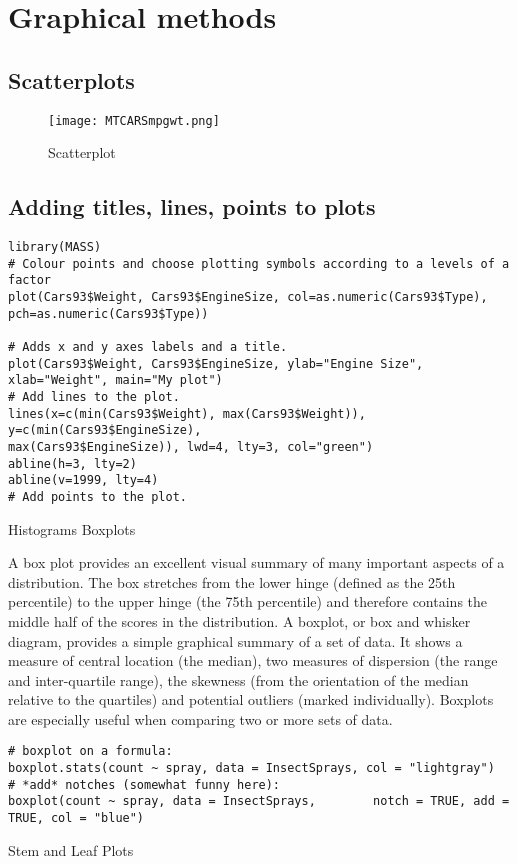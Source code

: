 \newpage
\chapter{Graphical methods}

\section{Scatterplots}
\begin{figure}
  \texttt{[image: MTCARSmpgwt.png]}\\
  \caption{Scatterplot}\label{mpgwt}
\end{figure}


\section{Adding titles, lines, points to plots}


\footnotesize \begin{verbatim}
library(MASS)
# Colour points and choose plotting symbols according to a levels of a factor
plot(Cars93$Weight, Cars93$EngineSize, col=as.numeric(Cars93$Type),
pch=as.numeric(Cars93$Type))

# Adds x and y axes labels and a title.
plot(Cars93$Weight, Cars93$EngineSize, ylab="Engine Size",
xlab="Weight", main="My plot")
# Add lines to the plot.
lines(x=c(min(Cars93$Weight), max(Cars93$Weight)), y=c(min(Cars93$EngineSize),
max(Cars93$EngineSize)), lwd=4, lty=3, col="green")
abline(h=3, lty=2)
abline(v=1999, lty=4)
# Add points to the plot.
\end{verbatim}\normalsize

\newpage

Histograms
Boxplots

A box plot provides an excellent visual summary of many important aspects of a distribution. 
The box stretches from the lower hinge (defined as the 25th percentile) to the upper hinge (the 75th percentile) and therefore contains the middle half of the scores in the distribution.
A boxplot, or box and whisker diagram, provides a simple graphical summary of a set of data. It shows a measure of central location (the median), two measures of dispersion (the range and inter-quartile range), the skewness (from the orientation of the median relative to the quartiles) and potential outliers (marked individually). 
Boxplots are especially useful when comparing two or more sets of data. 
\begin{verbatim}
# boxplot on a formula:
boxplot.stats(count ~ spray, data = InsectSprays, col = "lightgray")
# *add* notches (somewhat funny here):
boxplot(count ~ spray, data = InsectSprays,        notch = TRUE, add = TRUE, col = "blue")
\end{verbatim}
Stem and Leaf Plots

